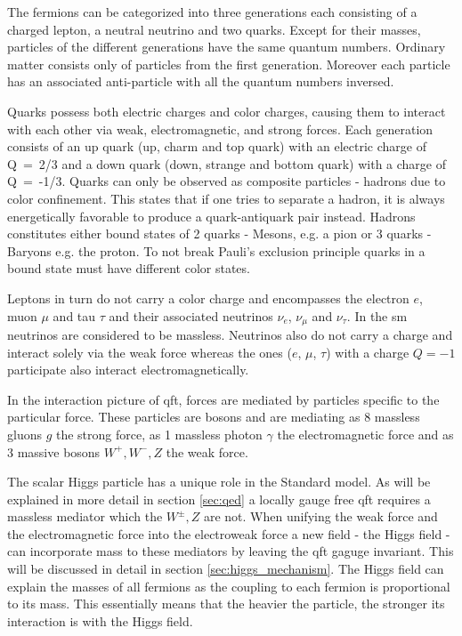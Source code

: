 The fermions can be categorized into three generations each consisting of a charged lepton, a neutral neutrino and two quarks. Except for their masses, particles of the different generations have the same quantum numbers. Ordinary matter consists only of particles from the first generation. Moreover each particle has an associated anti-particle with all the quantum numbers inversed. 

Quarks possess both electric charges and color charges, causing them to interact with each other via weak, electromagnetic, and strong forces. Each generation consists of an up quark (up, charm and top quark) with an electric charge of \mbox{Q = 2/3} and a down quark (down, strange and bottom quark) with a charge of \mbox{Q = -1/3}. Quarks can only be observed as composite particles - hadrons due to color confinement. This states that if one tries to separate a hadron, it is always energetically favorable to produce a quark-antiquark pair instead. Hadrons constitutes either bound states of 2 quarks - Mesons, e.g. a pion or 3 quarks - Baryons e.g. the proton. To not break Pauli's exclusion principle quarks in a bound state must have different color states.

Leptons in turn do not carry a color charge and encompasses the electron $e$, muon $\mu$ and tau $\tau$ and their associated neutrinos $\nu_e$, $\nu_\mu$ and $\nu_\tau$. In the \ac{sm} neutrinos are considered to be massless. Neutrinos also do not carry a charge and interact solely via the weak force whereas the  ones ($e$, $\mu$, $\tau$) with a charge $Q=-1$ participate also interact electromagnetically.

In the interaction picture of \ac{qft}, forces are mediated by particles specific to the particular force. These particles are bosons and are mediating as 8 massless gluons $g$ the strong force, as 1 massless photon $\gamma$ the electromagnetic force and as 3 massive bosons $W^+,W^-,Z$ the weak force. 

The scalar Higgs particle has a unique role in the Standard model. As will be explained in more detail in section \ref{sec:qed} a locally gauge free \ac{qft} requires a massless mediator which the $W^{\pm},Z$ are not. When unifying the weak force and the electromagnetic force into the electroweak force a new field - the Higgs field - can incorporate mass to these mediators by leaving the qft gaguge invariant. This will be discussed in detail in section \ref{sec:higgs_mechanism}. The Higgs field can explain the masses of all fermions as the coupling to each fermion is proportional to its mass. This essentially means that the heavier the particle, the stronger its interaction is with the Higgs field. 

